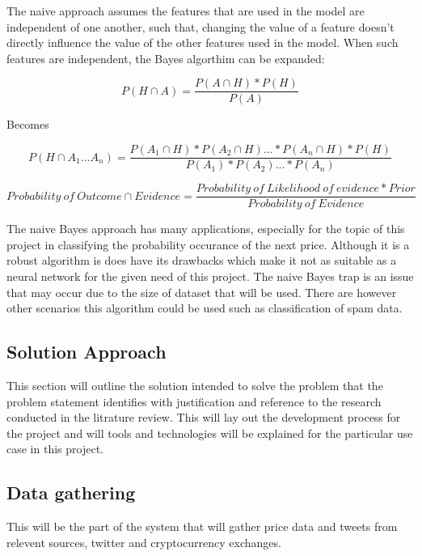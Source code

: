 \documentclass[oneside, 10pt]{article}
\begin{document}
			The naive approach assumes the features that are used in the model are independent of one another, such that, changing the value of a feature doesn't directly influence the value of the other features used in the model. When such features are independent, the Bayes algorthim can be expanded:
			
			\[P(H\cap A) = \frac{P(A\cap H) * P(H)}{P(A)} \]
			
			\begin{center}
				Becomes
			\end{center}
			
			\[P(H\cap A_1 ... A_n) = \frac{P(A_1\cap H) * P(A_2\cap H) ... * P(A_n\cap H) * P(H)}{P(A_1) * P(A_2) ... * P(A_n)} \]
			
			\[Probability \ of \ Outcome \cap Evidence = \frac{Probability \ of \ Likelihood \ of \ evidence * Prior}{Probability \ of \ Evidence} \]
			
			The naive Bayes approach has many applications, especially for the topic of this project in classifying the probability occurance of the next price. Although it is a robust algorithm is does have its drawbacks which make it not as suitable as a neural network for the given need of this project. The naive Bayes trap is an issue that may occur due to the size of dataset that will be used. There are however other scenarios this algorithm could be used such as classification of spam data.\cite{32}
		
	\newpage
	
	\begin{center}
		\section{Solution Approach}\label{solution}
	\end{center}
		This section will outline the solution intended to solve the problem that the problem statement identifies with justification and reference to the research conducted in the litrature review. This will lay out the development process for the project and will tools and technologies will be explained for the particular use case in this project.
		\newline
		
		\subsection{Data gathering}
		This will be the part of the system that will gather price data and tweets from relevent sources, twitter and cryptocurrency exchanges.
		\newline
		
\end{document}
